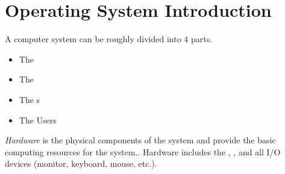 \section{Operating System Introduction}\label{sec:OS_Intro}
A computer system can be roughly divided into 4 parts.
\begin{itemize}[noitemsep]
\item The 
\item The 
\item The s
\item The Users
\end{itemize}

\begin{definition}[Hardware]\label{def:Hardware}
  \emph{Hardware} is the physical components of the system and provide the basic computing resources for the system..
  Hardware includes the , , and all I/O devices (monitor, keyboard, mouse, etc.).
\end{definition}

